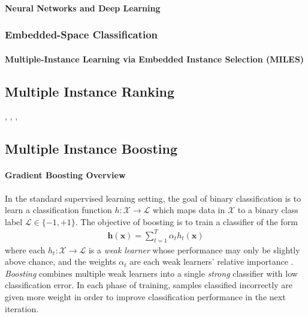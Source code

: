 \paragraph{Neural Networks and Deep Learning}

\subsubsection{Embedded-Space Classification}

\paragraph{Multiple-Instance Learning via Embedded Instance Selection (MILES)}


\subsection{Multiple Instance Ranking}


\cite{Hu2008MIRanking}, \cite{Bergeron2012FastBundleMILRanking}, \cite{Bergeron2008MIRanking}, \cite{Latham2015MIFeatureRankingThesis} \cite{Asif2017LargeMarginMIRanking}



\subsection{Multiple Instance Boosting}

\paragraph{Gradient Boosting Overview}
In the standard supervised learning setting, the goal of binary classification is to learn a classification function $h:\mathcal{X} \rightarrow \mathcal{L}$ which maps data in $\mathcal{X}$ to a binary class label $\mathcal{L} \in \{-1,+1\}$.  The objective of boosting is to train a classifier of the form
\begin{align}
	\bm{h}(\bm{x}) = \sum_{t=1}^{T}\alpha_{t}h_{t}(\bm{x})
\end{align}
\noindent
where each $h_{t}:\mathcal{X} \rightarrow \mathcal{L}$ is a \textit{weak learner} whose performance may only be slightly above chance, and the weights $\alpha_{t}$ are each weak learners' relative importance \citep{Babenko2008MIBoosting}.  \textit{Boosting} combines multiple weak learners into a single \textit{strong} classifier with low classification error.  In each phase of training, samples classified incorrectly are given more weight in order to improve classification performance in the next iteration.  

